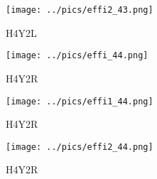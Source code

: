 \documentclass[10pt, xcolor={dvipsnames}, aspectratio = 169]{beamer}
\begin{document}
\begin{frame}

\begin{figure}
\centering
\texttt{[image: ../pics/effi2\_43.png]}
\caption{H4Y2L}
\end{figure}

\end{frame}

\begin{frame}

\begin{figure}
\centering
\texttt{[image: ../pics/effi\_44.png]}
\caption{H4Y2R}
\end{figure}

\end{frame}

\begin{frame}

\begin{figure}
\centering
\texttt{[image: ../pics/effi1\_44.png]}
\caption{H4Y2R}
\end{figure}

\end{frame}

\begin{frame}

\begin{figure}
\centering
\texttt{[image: ../pics/effi2\_44.png]}
\caption{H4Y2R}
\end{figure}

\end{frame}
\end{document}

